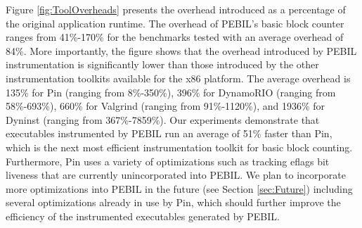 Figure \ref{fig:ToolOverheads} presents the overhead introduced as a percentage
of the original application runtime. The overhead of PEBIL's basic block counter
ranges from 41\%-170\% for the benchmarks tested with an average overhead of
84\%. More importantly, the figure shows that the overhead introduced by PEBIL
instrumentation is significantly lower than those introduced by the other
instrumentation toolkits available for the x86 platform. The average overhead is
135\% for Pin (ranging from 8\%-350\%), 396\% for DynamoRIO (ranging from
58\%-693\%), 660\% for Valgrind (ranging from 91\%-1120\%), and 1936\% for
Dyninst (ranging from 367\%-7859\%). Our experiments demonstrate that
executables instrumented by PEBIL run an average of 51\% faster than Pin, which
is the next most efficient instrumentation toolkit for basic block counting.
Furthermore, Pin uses a variety of optimizations such as tracking eflags bit
liveness \cite{luk2005pin} that are currently unincorporated into PEBIL. We plan
to incorporate more optimizations into PEBIL in the future (see Section
\ref{sec:Future}) including several optimizations already in use by Pin, which
should further improve the efficiency of the instrumented executables generated
by PEBIL.

